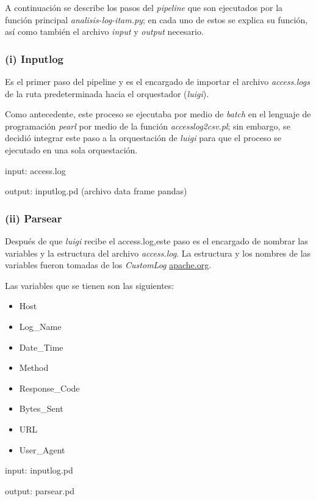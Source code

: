\documentclass[]{article}
\begin{document}
A continuación se describe los pasos del \emph{pipeline} que son
ejecutados por la función principal \emph{analisis-log-itam.py}; en cada
uno de estos se explica su función, así como también el archivo
\emph{input} y \emph{output} necesario.

\subsubsection{(i) Inputlog}\label{i-inputlog}

Es el primer paso del pipeline y es el encargado de importar el archivo
\emph{access.logs} de la ruta predeterminada hacia el orquestador
(\emph{luigi}).

Como antecedente, este proceso se ejecutaba por medio de \emph{batch} en
el lenguaje de programación \emph{pearl} por medio de la función
\emph{accesslog2csv.pl}; sin embargo, se decidió integrar este paso a la
orquestación de \emph{luigi} para que el proceso se ejecutado en una
sola orquestación.

input: access.log

output: inputlog.pd (archivo data frame pandas)

\subsubsection{(ii) Parsear}\label{ii-parsear}

Después de que \emph{luigi} recibe el access.log,este paso es el
encargado de nombrar las variables y la estructura del archivo
\emph{access.log}. La estructura y los nombres de las variables fueron
tomadas de los \emph{CustomLog}
\href{https://httpd.apache.org/docs/2.2/logs.html}{apache.org}.

Las variables que se tienen son las siguientes:

\begin{itemize}
\itemsep1pt\parskip0pt
\item
  Host
\item
  Log\_Name
\item
  Date\_Time
\item
  Method
\item
  Response\_Code
\item
  Bytes\_Sent
\item
  URL
\item
  User\_Agent
\end{itemize}

input: inputlog.pd

output: parsear.pd
\end{document}
